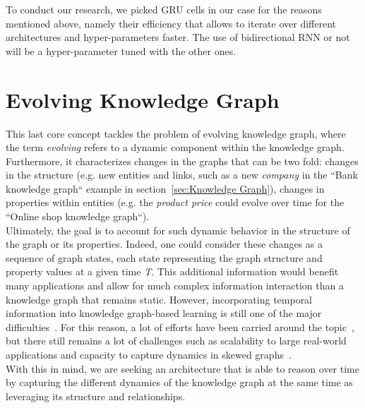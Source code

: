 To conduct our research, we picked GRU cells in our case for the reasons mentioned above, namely their efficiency that allows to iterate over different architectures and hyper-parameters faster. The use of bidirectional RNN or not will be a hyper-parameter tuned with the other ones.

\section{Evolving Knowledge Graph}
\label{sec:Evolving Knowledge Graph}
This last core concept tackles the problem of evolving knowledge graph, where the term \emph{evolving} refers to a dynamic component within the knowledge graph. Furthermore, it characterizes changes in the graphs that can be two fold: changes in the structure (e.g. new entities and links, such as a new \emph{company} in the ``Bank knowledge graph`` example in section~\ref{sec:Knowledge Graph}), changes in properties within entities (e.g. the \emph{product price} could evolve over time for the ``Online shop knowledge graph``). \\

Ultimately, the goal is to account for such dynamic behavior in the structure of the graph or its properties. Indeed, one could consider these changes as a sequence of graph states, each state representing the graph structure and property values at a given time \emph{T}. This additional information would benefit many applications and allow for much complex information interaction than a knowledge graph that remains static. However, incorporating temporal information into knowledge graph-based learning is still one of the major difficulties~\cite{LiuZhiyuan:247}. For this reason, a lot of efforts have been carried around the topic~\cite{D16-1260, 7527876, DBLP:journals/corr/TrivediDWS17, 8047276}, but there still remains a lot of challenges such as scalability to large real-world applications and capacity to capture dynamics in skewed graphs~\cite{DBLP:journals/corr/abs-1812-02289}. \\

With this in mind, we are seeking an architecture that is able to reason over time by capturing the different dynamics of the knowledge graph at the same time as leveraging its structure and relationships. 
